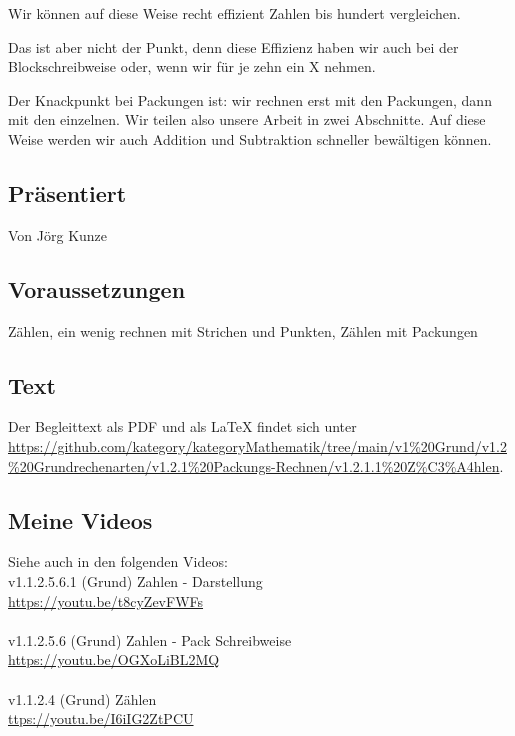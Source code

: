 \documentclass[a4paper]{amsart}
\theoremstyle{definition}
\begin{document}
Wir können auf diese Weise recht effizient Zahlen bis hundert vergleichen.

Das ist aber nicht der Punkt, denn diese Effizienz haben wir auch bei der Blockschreibweise oder, wenn wir für je zehn ein X nehmen.

Der Knackpunkt bei Packungen ist: wir rechnen erst mit den Packungen, dann mit den einzelnen. Wir teilen also unsere Arbeit in zwei Abschnitte. Auf diese Weise werden wir auch Addition und Subtraktion schneller bewältigen können.

\subsection*{Präsentiert}
Von Jörg Kunze

\subsection*{Voraussetzungen}
Zählen, ein wenig rechnen mit Strichen und Punkten, Zählen mit Packungen

\subsection*{Text}
Der Begleittext als PDF und als LaTeX findet sich unter\\
{\tiny\url{https://github.com/kategory/kategoryMathematik/tree/main/v1%20Grund/v1.2%20Grundrechenarten/v1.2.1%20Packungs-Rechnen/v1.2.1.1%20Z%C3%A4hlen}}.

\subsection*{Meine Videos}
Siehe auch in den folgenden Videos:\\
v1.1.2.5.6.1 (Grund) Zahlen - Darstellung\\
\url{https://youtu.be/t8cyZevFWFs}\\
\\
v1.1.2.5.6 (Grund) Zahlen - Pack Schreibweise\\
\url{https://youtu.be/OGXoLiBL2MQ}\\
\\
v1.1.2.4 (Grund) Zählen\\
\url{ttps://youtu.be/I6iIG2ZtPCU}\\
\end{document}
